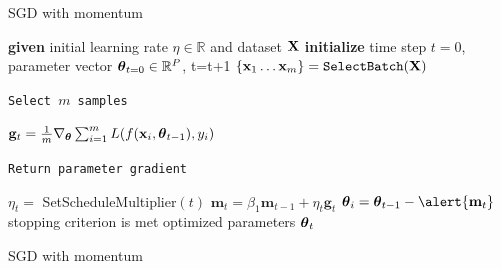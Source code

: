 \documentclass[handout,xcolor=pdftex,dvipsnames,table,mathserif]{beamer}
\begin{document}
\begin{frame}{SGD with momentum \cite{Qian99}}
\begin{algorithm}[H]
\begin{algorithmic}[1]
\STATE \textbf{given} initial learning rate $\eta \in \mathbb{R}$ and dataset $\mathbf{X}$
\STATE \textbf{initialize} time step $t=0$, parameter vector $\boldsymbol{\theta}_{t=0} \in \mathbb{R}^P$,
\REPEAT
\STATE t=t+1
\STATE $\{\mathbf{x}_1 \ldots \mathbf{x}_m\}=\texttt{SelectBatch} (\mathbf{X})$ \begin{tiny}\texttt{Select $m$ samples} \end{tiny}
\STATE $\mathbf{g}_t = \frac{1}{m} \nabla_{\boldsymbol{\theta}} \sum_{i=1}^m L(f(\mathbf{x}_i,\boldsymbol{\theta}_{t-1}), y_i)$  \begin{tiny}\texttt{Return parameter gradient}\end{tiny}
\STATE $\eta_t = $ SetScheduleMultiplier$(t)$ 
\STATE \alert{$\mathbf{m}_t = \beta_1 \mathbf{m}_{t-1} + \eta_{t} \mathbf{g}_t $}
\STATE $\param_i=\param_{t-1} - \alert{\mathbf{m}_{t}}$
\UNTIL stopping criterion is met
\RETURN optimized parameters $\boldsymbol{\theta}_t$
\end{algorithmic}
\caption{SGD with momentum}
\label{alg:momentum}
\end{algorithm}
\end{frame}


\end{document}

